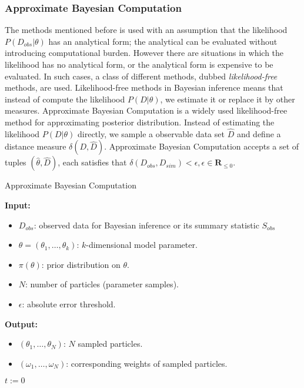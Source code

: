 \subsubsection{Approximate Bayesian Computation}
The methods mentioned before is used with an assumption that the likelihood $P(D_{obs}|\theta)$ has
an analytical form; the analytical can be evaluated without introducing computational burden.
However there are situations in which the likelihood has no analytical form, or the analytical form
is expensive to be evaluated. In such cases, a class of different methods, dubbed
\textit{likelihood-free} methods, are used. Likelihood-free methods in Bayesian inference means that
instead of compute the likelihood $P(D|\theta)$, we estimate it or replace it by other measures.
Approximate Bayesian Computation is a widely used likelihood-free method for approximating posterior
distribution. Instead of estimating the likelihood $P(D|\theta)$ directly, we sample a observable
data set $\hat{D}$ and define a distance measure $\delta(D, \hat{D})$. Approximate Bayesian
Computation accepts a set of tuples $(\hat{\theta}, \hat{D})$, each satisfies that
$\delta(D_{obs},D_{sim}) < \epsilon, \epsilon\in\mathbf{R}_{\leq 0}$.
\begin{algorithm}[H]
    \caption{Approximate Bayesian Computation}
    \label{abcalg}
    \hspace*{\algorithmicindent} \textbf{Input:}
    \begin{itemize}
        \item $D_{obs}$: observed data for Bayesian inference or its summary statistic $S_{obs}$
        \item $\theta=(\theta_1,\ldots,\theta_k)$: $k$-dimensional model parameter.
        \item $\pi(\theta)$: prior distribution on $\theta$.
        \item $N$: number of particles (parameter samples).
        \item $\epsilon$: absolute error threshold.
    \end{itemize}
    \hspace*{\algorithmicindent} \textbf{Output:}
    \begin{itemize}
        \item $(\theta_1,\ldots,\theta_N)$: $N$ sampled particles.
        \item $(\omega_1,\ldots,\omega_N)$: corresponding weights of sampled particles.
    \end{itemize}
    \begin{algorithmic}[1]
        \State $t:=0$  \EndWhile \EndProcedure
    \end{algorithmic}
\end{algorithm}

